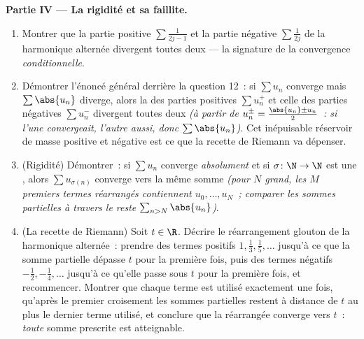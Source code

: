 \begin{problem}[{Devoir maison --- $H_n = \ln n + \gamma +
\frac{1}{2n} + O(n^{-2})$, et le réarrangement de $1 - \frac12 +
\frac13 - \dots$ en $\frac{\ln 2}{2}$}]
\medskip
\noindent\textbf{Partie IV --- La rigidité et sa faillite.}
\begin{enumerate}[resume]
  \item Montrer que la partie positive $\sum \frac{1}{2j-1}$ et la
        partie négative $\sum \frac{1}{2j}$ de la  harmonique
        alternée divergent toutes deux --- la signature de la
        convergence \emph{conditionnelle}.
  \item Démontrer l'énoncé général derrière la question 12~: si
        $\sum u_n$ converge mais $\sum \abs{u_n}$ diverge, alors la
         des parties positives $\sum u_n^+$ et celle des parties
        négatives $\sum u_n^-$ divergent toutes deux \emph{(à partir
        de $u_n^\pm = \frac{\abs{u_n} \pm u_n}{2}$~: si l'une
        convergeait, l'autre aussi, donc $\sum\abs{u_n}$)}.
        Cet inépuisable réservoir de masse positive et négative est
        ce que la recette de Riemann va dépenser.
  \item (Rigidité) Démontrer~: si $\sum u_n$ converge
        \emph{absolument} et si $\sigma \colon \N \to \N$ est une
        , alors $\sum u_{\sigma(n)}$ converge vers la même
        somme \emph{(pour $N$ grand, les $M$ premiers termes
        réarrangés contiennent $u_0, \dots, u_N$~; comparer les
        sommes partielles à travers le reste $\sum_{n >
        N}\abs{u_n}$)}.
  \item (La recette de Riemann) Soit $t \in \R$. Décrire le
        réarrangement glouton de la  harmonique alternée~:
        prendre des termes positifs $1, \frac13, \frac15, \dots$
        jusqu'à ce que la somme partielle dépasse $t$ pour la
        première fois, puis des termes négatifs
        $-\frac12, -\frac14, \dots$ jusqu'à ce qu'elle passe sous
        $t$ pour la première fois, et recommencer. Montrer que
        chaque terme est utilisé exactement une fois, qu'après le
        premier croisement les sommes partielles restent à distance
        de $t$ au plus le dernier terme utilisé, et conclure que la
         réarrangée converge vers $t$~: \emph{toute} somme
        prescrite est atteignable.
\end{enumerate}


\end{problem}
